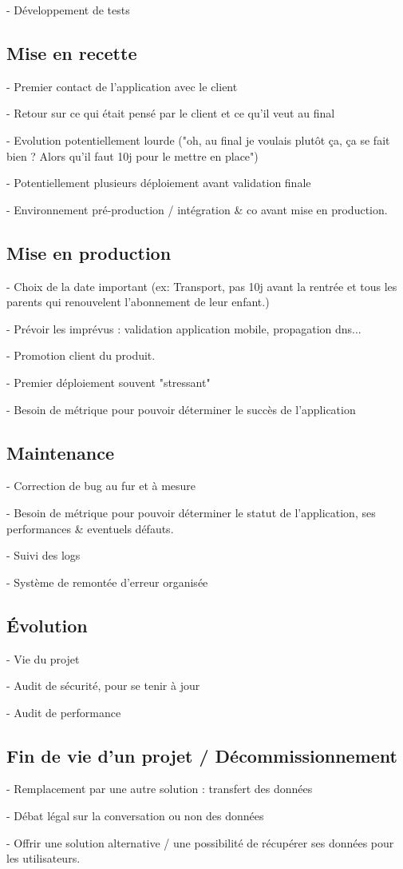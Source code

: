 - Développement de tests

\subsection{Mise en recette}

- Premier contact de l'application avec le client

- Retour sur ce qui était pensé par le client et ce qu'il veut au final

- Evolution potentiellement lourde ("oh, au final je voulais plutôt ça, ça se fait bien ? Alors qu'il faut 10j pour le mettre en place")

- Potentiellement plusieurs déploiement avant validation finale

- Environnement pré-production / intégration \& co avant mise en production.

\subsection{Mise en production}

- Choix de la date important (ex: Transport, pas 10j avant la rentrée et tous les parents qui renouvelent l'abonnement de leur enfant.)

- Prévoir les imprévus : validation application mobile, propagation dns...

- Promotion client du produit.

- Premier déploiement souvent "stressant"

- Besoin de métrique pour pouvoir déterminer le succès de l'application

\subsection{Maintenance}

- Correction de bug au fur et à mesure

- Besoin de métrique pour pouvoir déterminer le statut de l'application, ses performances \& eventuels défauts.

- Suivi des logs 

- Système de remontée d'erreur organisée

\subsection{Évolution}

- Vie du projet

- Audit de sécurité, pour se tenir à jour

- Audit de performance

\subsection{Fin de vie d'un projet / Décommissionnement}

- Remplacement par une autre solution : transfert des données

- Débat légal sur la conversation ou non des données

- Offrir une solution alternative / une possibilité de récupérer ses données pour les utilisateurs.

